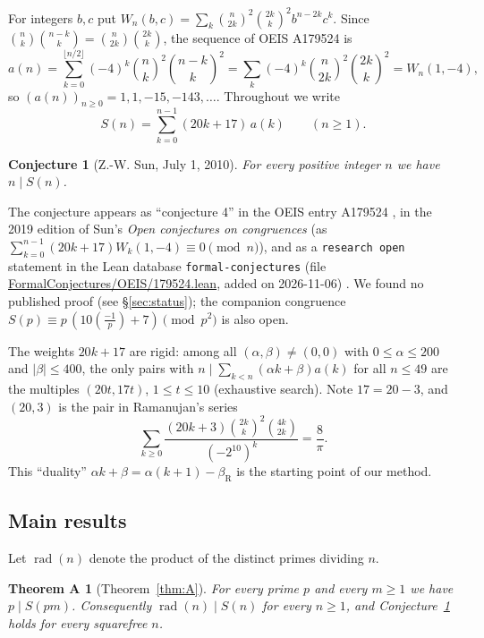 \documentclass[11pt]{amsart}
\newtheorem{conjecture}[theorem]{Conjecture}
\newtheorem*{mainA}{Theorem A}
\theoremstyle{definition}
\newcommand{\rad}{\operatorname{rad}}
\begin{document}
For integers $b,c$ put $W_n(b,c)=\sum_{k}\binom n{2k}^2\binom{2k}k^2b^{n-2k}c^k$. Since
$\binom nk\binom{n-k}k=\binom n{2k}\binom{2k}k$, the sequence of OEIS A179524 is
\begin{equation}\label{eq:a}
a(n)=\sum_{k=0}^{\lfloor n/2\rfloor}(-4)^k\binom nk^2\binom{n-k}k^2
      =\sum_{k}(-4)^k\binom n{2k}^2\binom{2k}k^2=W_n(1,-4),
\end{equation}
so $(a(n))_{n\ge0}=1,1,-15,-143,\dots$. Throughout we write
\[
S(n)=\sum_{k=0}^{n-1}(20k+17)\,a(k)\qquad(n\ge1).
\]

\begin{conjecture}[Z.-W. Sun, July 1, 2010]\label{conj:sun}
For every positive integer $n$ we have $n\mid S(n)$.
\end{conjecture}

The conjecture appears as ``conjecture 4'' in the OEIS entry A179524 \cite{OEIS}, in the 2019
edition of Sun's \emph{Open conjectures on congruences} \cite{SunOpen} (as
$\sum_{k=0}^{n-1}(20k+17)W_k(1,-4)\equiv0\pmod n$), and as a \texttt{research open} statement in
the Lean database \texttt{formal-conjectures} (file \url{FormalConjectures/OEIS/179524.lean},
added on 2026-11-06) \cite{FC}. We found no published proof (see \S\ref{sec:status}); the
companion congruence $S(p)\equiv p\,(10(\tfrac{-1}p)+7)\pmod{p^2}$ is also open.

The weights $20k+17$ are rigid: among all $(\alpha,\beta)\ne(0,0)$ with $0\le\alpha\le200$ and
$|\beta|\le400$, the only pairs with $n\mid\sum_{k<n}(\alpha k+\beta)a(k)$ for all $n\le49$ are the
multiples $(20t,17t)$, $1\le t\le10$ (exhaustive search). Note
$17=20-3$, and $(20,3)$ is the pair in Ramanujan's series
\begin{equation}\label{eq:ram}
\sum_{k\ge0}\frac{(20k+3)\binom{2k}k^2\binom{4k}{2k}}{(-2^{10})^k}=\frac8\pi .
\end{equation}
This ``duality'' $\alpha k+\beta=\alpha(k+1)-\beta_{\mathrm R}$ is the starting point of our
method.

\subsection*{Main results}
Let $\rad(n)$ denote the product of the distinct primes dividing $n$.

\begin{mainA}[Theorem~\ref{thm:A}]
For every prime $p$ and every $m\ge1$ we have $p\mid S(pm)$. Consequently $\rad(n)\mid S(n)$ for
every $n\ge1$, and Conjecture~\ref{conj:sun} holds for every squarefree $n$.
\end{mainA}
\end{document}
